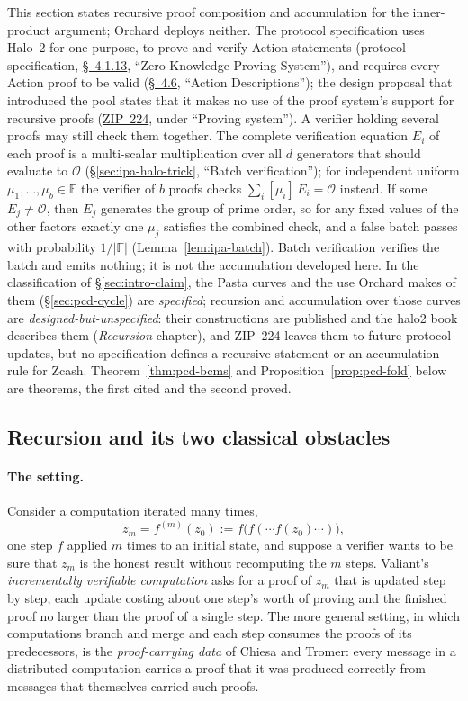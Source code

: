 \documentclass[11pt,a4paper]{article}
\theoremstyle{definition}
\newcommand{\F}{\mathbb{F}}
\begin{document}
This section states recursive proof composition and accumulation for
the inner-product argument; Orchard deploys neither. The protocol
specification uses Halo~2 for one purpose, to prove and verify Action
statements (protocol specification,
\href{https://zips.z.cash/protocol/protocol.pdf\#abstractzk}{\S~4.1.13},
``Zero-Knowledge Proving System''), and requires every Action proof to be
valid
(\href{https://zips.z.cash/protocol/protocol.pdf\#actiondesc}{\S~4.6},
``Action Descriptions''); the design proposal that introduced the pool
states that it makes no use of the proof system's support for recursive
proofs (\href{https://zips.z.cash/zip-0224}{ZIP~224}, under ``Proving
system''). A verifier holding several proofs may still check them
together. The complete verification equation $E_i$ of each proof is a
multi-scalar multiplication over all $d$ generators that should evaluate
to $\mathcal O$ (\S\ref{sec:ipa-halo-trick}, ``Batch verification''); for
independent uniform
$\mu_1, \dots, \mu_b \in \F$ the verifier of $b$ proofs checks
$\sum_i [\mu_i]\,E_i = \mathcal O$ instead. If some $E_j \ne \mathcal O$,
then $E_j$ generates the group of prime order, so for any fixed values
of the other factors exactly one $\mu_j$ satisfies the combined check, and
a false batch passes with probability $1/|\F|$
(Lemma~\ref{lem:ipa-batch}). Batch verification verifies the batch and
emits nothing; it is not the accumulation developed here. In the
classification of \S\ref{sec:intro-claim}, the Pasta curves and the use
Orchard makes of them (\S\ref{sec:pcd-cycle}) are \emph{specified};
recursion and accumulation over those curves are
\emph{designed-but-unspecified}: their constructions are published and
the halo2 book describes them (\emph{Recursion} chapter), and ZIP~224
leaves them to future protocol updates, but no specification defines a
recursive statement or an accumulation rule for Zcash.
Theorem~\ref{thm:pcd-bcms} and Proposition~\ref{prop:pcd-fold} below are
theorems, the first cited and the second proved.

\subsection{Recursion and its two classical obstacles}
\label{sec:pcd-obstacles}

\paragraph{The setting.}
Consider a computation iterated many times,
\[
z_m = f^{(m)}(z_0) := f\bigl(f(\cdots f(z_0)\cdots)\bigr),
\]
one step $f$ applied $m$ times to an initial state, and suppose a
verifier wants to be sure that $z_m$ is the honest result without
recomputing the $m$ steps. Valiant's \emph{incrementally verifiable
computation} asks for a proof of $z_m$ that is updated step by step,
each update costing about one step's worth of proving and the finished
proof no larger than the proof of a single step. The more general
setting, in which computations branch and merge and each step consumes
the proofs of its predecessors, is the \emph{proof-carrying data} of
Chiesa and Tromer: every message in a distributed computation carries a
proof that it was produced correctly from messages that themselves
carried such proofs.
\end{document}
